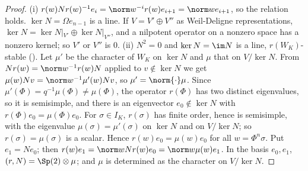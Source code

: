 \begin{proof}
(i) $r(w)Nr(w)^{-1}e_i=\norm w^{-i}r(w)e_{i+1}=\norm we_{i+1}$, so the relation holds. $\ker N=\Omega e_{n-1}$ is a line. If $V=V'\oplus V''$ as Weil-Deligne
representations, $\ker N=\ker N|_{V'}\oplus\ker N|_{V''}$, and a nilpotent operator on a nonzero space has a nonzero kernel; so $V'$ or $V''$ is $0$.
(ii) $N^2=0$ and $\ker N=\im N$ is a line, $r(W_K)$-stable (). Let $\mu'$ be the character of $W_K$ on $\ker N$ and $\mu$ that on
$V/\ker N$. From $Nr(w)=\norm w^{-1}r(w)N$ applied to $v\notin\ker N$ we get $\mu(w)Nv=\norm w^{-1}\mu'(w)Nv$, so $\mu'=\norm{\cdot}\mu$. Since $\mu'(\Phi)=q^{-1}\mu(\Phi)\ne\mu(\Phi)$, the
operator $r(\Phi)$ has two distinct eigenvalues, so it is semisimple, and there is an eigenvector $e_0\notin\ker N$ with $r(\Phi)e_0=\mu(\Phi)e_0$. For $\sigma\in I_K$, $r(\sigma)$ has finite order, hence is semisimple, with the
eigenvalue $\mu(\sigma)=\mu'(\sigma)$ on $\ker N$ and on $V/\ker N$; so $r(\sigma)=\mu(\sigma)$ is a scalar. Hence $r(w)e_0=\mu(w)e_0$ for all $w=\Phi^n\sigma$. Put $e_1=Ne_0$; then
$r(w)e_1=\norm wNr(w)e_0=\norm w\mu(w)e_1$. In the basis $e_0,e_1$, $(r,N)=\Sp(2)\otimes\mu$; and $\mu$ is determined as the character on $V/\ker N$.
\end{proof}

